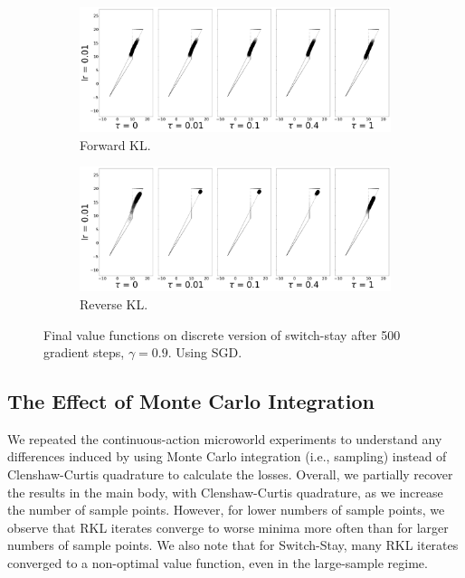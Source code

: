 \documentclass{article}
\begin{document}
\begin{figure}[!htb]
  \centering
  \begin{subfigure}[b]{0.5\linewidth}
    \centering
    \includegraphics[width=0.8\columnwidth]{figs/switch-stay/notlearnQ/polytope_forward_optim=sgd.png}
    \caption{Forward KL.}
    \label{fig:switch-stay-forward-sgd}
  \end{subfigure}%
  \begin{subfigure}[b]{0.5\linewidth}
        \centering
        \includegraphics[width=0.8\columnwidth]{figs/switch-stay/notlearnQ/polytope_reverse_optim=sgd.png}
        \caption{Reverse KL.}
        \label{fig:switch-stay-reverse-sgd}
  \end{subfigure}
  \caption{Final value functions on discrete version of switch-stay after 500 gradient steps, $\gamma = 0.9$. Using SGD.}
\end{figure}

\subsection{The Effect of Monte Carlo Integration}
We repeated the continuous-action microworld experiments to understand any differences induced by using Monte Carlo integration (i.e., sampling) instead of Clenshaw-Curtis quadrature to calculate the losses. Overall, we partially recover the results in the main body, with Clenshaw-Curtis quadrature, as we increase the number of sample points. However, for lower numbers of sample points, we observe that RKL iterates converge to worse minima more often than for larger numbers of sample points. We also note that for Switch-Stay, many RKL iterates converged to a non-optimal value function, even in the large-sample regime.    
\end{document}
